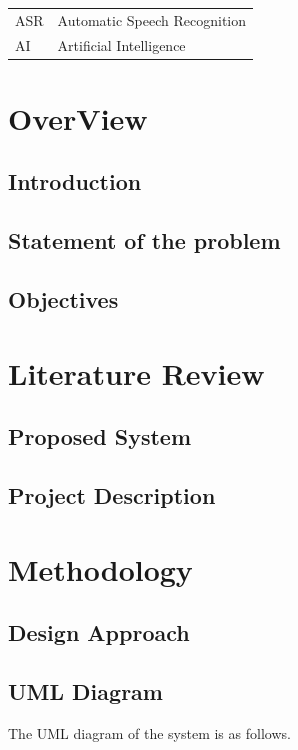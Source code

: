\documentclass[a4paper,12pt,onepage]{article}
\begin{document}
\begin{tabular}{l l}
  ASR & Automatic Speech Recognition \\
  AI & Artificial Intelligence \\
\end{tabular}

\cleardoublepage
{}
\section{OverView}

\subsection{Introduction}

\newpage
\subsection{Statement of the problem}

\newpage
\subsection{Objectives}

\newpage
\section{Literature Review} 
	\subsection{Proposed System}
	\newpage
	
	\subsection{Project Description}
	\newpage
\section{Methodology}
\subsection{Design Approach}

\newpage
\subsection{UML Diagram}
The UML diagram of the system is as follows.
\end{document}
